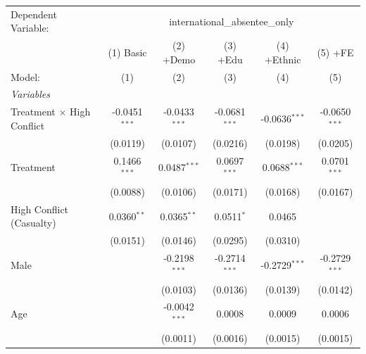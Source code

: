 
\begingroup
\centering
\begin{tabular}{lccccc}
   \tabularnewline \midrule \midrule
   Dependent Variable: & \multicolumn{5}{c}{international\_absentee\_only}\\
                                     & (1) Basic       & (2) +Demo               & (3) +Edu                       & (4) +Ethnic                   & (5) +FE \\   
   Model:                            & (1)             & (2)                     & (3)                            & (4)                           & (5)\\  
   \midrule
   \emph{Variables}\\
   Treatment $\times$ High Conflict  & -0.0451$^{***}$ & -0.0433$^{***}$         & -0.0681$^{***}$                & -0.0636$^{***}$               & -0.0650$^{***}$\\   
                                     & (0.0119)        & (0.0107)                & (0.0216)                       & (0.0198)                      & (0.0205)\\   
   Treatment                         & 0.1466$^{***}$  & 0.0487$^{***}$          & 0.0697$^{***}$                 & 0.0688$^{***}$                & 0.0701$^{***}$\\   
                                     & (0.0088)        & (0.0106)                & (0.0171)                       & (0.0168)                      & (0.0167)\\   
   High Conflict (Casualty)          & 0.0360$^{**}$   & 0.0365$^{**}$           & 0.0511$^{*}$                   & 0.0465                        &   \\   
                                     & (0.0151)        & (0.0146)                & (0.0295)                       & (0.0310)                      &   \\   
   Male                              &                 & -0.2198$^{***}$         & -0.2714$^{***}$                & -0.2729$^{***}$               & -0.2729$^{***}$\\   
                                     &                 & (0.0103)                & (0.0136)                       & (0.0139)                      & (0.0142)\\   
   Age                               &                 & -0.0042$^{***}$         & 0.0008                         & 0.0009                        & 0.0006\\   
                                     &                 & (0.0011)                & (0.0016)                       & (0.0015)                      & (0.0015)\\   

\end{tabular}
